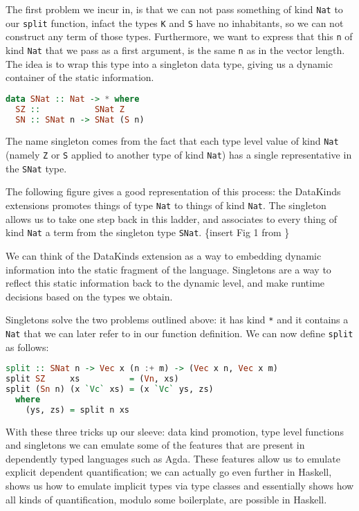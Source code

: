 \documentclass[11pt]{article}
\begin{document}
The first problem we incur in, is that we can not pass something of kind
\texttt{Nat} to our \texttt{split} function, infact the types \texttt{K} and \texttt{S} have no inhabitants, so we can
not construct any term of those types. Furthermore, we want to
express that this \texttt{n} of kind \texttt{Nat} that we pass as a
first argument, is the same \texttt{n} as in the vector length. The idea is to 
wrap this type into a singleton data type, giving us a dynamic container of the static 
information.

\begin{lstlisting}[language=haskell]
data SNat :: Nat -> * where
  SZ ::           SNat Z
  SN :: SNat n -> SNat (S n)
\end{lstlisting}

The name singleton comes from the fact that each type level value of
kind \texttt{Nat} (namely \texttt{Z} or \texttt{S} applied to another
type of kind \texttt{Nat}) has a single representative in the
\texttt{SNat} type.

The following figure gives a good representation of this process: the
DataKinds extensions promotes things of type \texttt{Nat} to things of
kind \texttt{Nat}. The singleton allows us to take one step back in this
ladder, and associates to every thing of kind \texttt{Nat} a term from
the singleton type \texttt{SNat}. \{insert Fig 1 from
\cite{singletons1}\}


We can think of the DataKinds extension as a way to embedding dynamic information into the static fragment of 
the language. Singletons are a way to reflect this static information back to 
the dynamic level, and make runtime decisions based on the types we obtain.


Singletons solve the two problems outlined above: it has kind \texttt{*}
and it contains a \texttt{Nat} that we can later refer to in our
function definition. We can now define \texttt{split} as follows:

\begin{lstlisting}[language=haskell]
split :: SNat n -> Vec x (n :+ m) -> (Vec x n, Vec x m)
split SZ     xs          = (Vn, xs)
split (Sn n) (x `Vc` xs) = (x `Vc` ys, zs)
  where
    (ys, zs) = split n xs
\end{lstlisting}

With these three tricks up our sleeve: data kind promotion, type level
functions and singletons we can emulate some of the features that are
present in dependently typed languages such as Agda. These features allow us to 
emulate explicit dependent quantification; we can actually go even further in 
Haskell, \cite{hasochism} shows us how to emulate implicit types via type 
classes and essentially shows how all kinds of quantification, modulo some boilerplate, are possible in 
Haskell.
\end{document}
